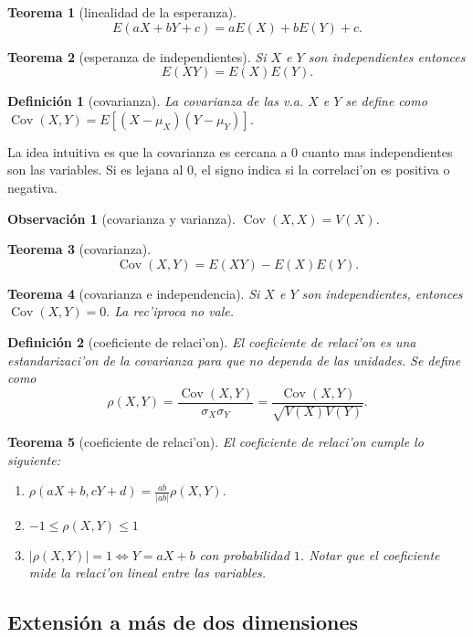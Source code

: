 \documentclass[a4paper,spanish]{article}
\DeclareMathOperator{\Cov}{Cov}
\newtheorem{teo}{Teorema}
\newtheorem{defi}{Definici\'on}
\newtheorem{obs}{Observaci\'on}
\begin{document}
\begin{teo}[linealidad de la esperanza]
$$E(aX + bY + c) = aE(X) + bE(Y) + c.$$
\end{teo}

\begin{teo}[esperanza de independientes]
Si $X$ e $Y$ son independientes entonces
$$E(XY) = E(X)E(Y).$$
\end{teo}

\begin{defi}[covarianza]
La covarianza de las v.a. $X$ e $Y$ se define como 
$\Cov(X,Y) = E[(X-\mu_X)(Y-\mu_Y)]$.
\end{defi}
La idea intuitiva es que la covarianza es cercana a $0$ cuanto mas
independientes son las variables. Si es lejana al $0$, el signo indica si la
correlaci'on es positiva o negativa.

\begin{obs}[covarianza y varianza]
$\Cov(X,X) = V(X)$.
\end{obs}

\begin{teo}[covarianza]
$$\Cov(X,Y) = E(XY) - E(X)E(Y).$$
\end{teo}

\begin{teo}[covarianza e independencia]
Si $X$ e $Y$ son independientes, entonces $\Cov(X,Y) = 0.$ La rec'iproca no
vale.
\end{teo}

\begin{defi}[coeficiente de relaci'on]
El \emph{coeficiente de relaci'on} es una estandarizaci'on de la covarianza
para que no dependa de las unidades. Se define como
$$\rho(X,Y) = \frac{\Cov(X,Y)}{\sigma_X \sigma_Y} =
	\frac{\Cov(X,Y)}{\sqrt{V(X)V(Y)}}.$$
\end{defi}

\begin{teo}[coeficiente de relaci'on]
El coeficiente de relaci'on cumple lo siguiente:
\begin{enumerate}
\item $\rho(aX+b,cY+d) = \frac{ab}{|ab|} \rho(X,Y).$
\item $-1 \leq \rho(X,Y) \leq 1$
\item $|\rho(X,Y)| = 1 \Leftrightarrow	Y = aX+b$ con probabilidad $1$. Notar
que el coeficiente mide la relaci'on lineal entre las variables.
\end{enumerate}
\end{teo}

\subsection{Extensi\'on a m\'as de dos dimensiones}
\end{document}

